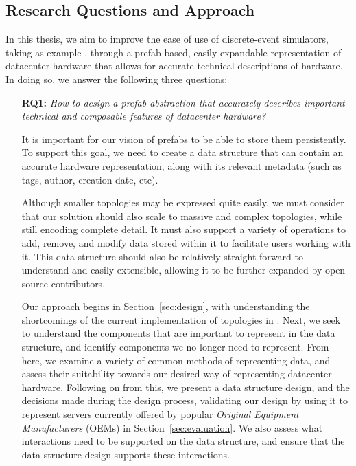 \documentclass[11pt]{article}
\begin{document}
	\subsection{Research Questions and Approach}
		In this thesis, we aim to improve the ease of use of discrete-event simulators, taking as example \opendc{}, through a prefab-based, easily expandable representation of datacenter hardware that allows for accurate technical descriptions of hardware. 
		In doing so, we answer the following three questions:
		\begin{itemize}
			\item [\textbf{RQ1:}] \textit{How to design a prefab abstraction that accurately describes important technical and composable features of datacenter hardware?}

			It is important for our vision of prefabs to be able to store them persistently.
			To support this goal, we need to create a data structure that can contain an accurate hardware representation, along with its relevant metadata (such as tags, author, creation date, etc).

			Although smaller topologies may be expressed quite easily, we must consider that our solution should also scale to massive and complex topologies, while still encoding complete detail.
			It must also support a variety of operations to add, remove, and modify data stored within it to facilitate users working with it.
			This data structure should also be relatively straight-forward to understand and easily extensible, allowing it to be further expanded by open source contributors.

			Our approach begins in Section~\ref{sec:design}, with understanding the shortcomings of the current implementation of topologies in \opendc{}.
			Next, we seek to understand the components that are important to represent in the data structure, and identify components we no longer need to represent.
			From here, we examine a variety of common methods of representing data, and assess their suitability towards our desired way of representing datacenter hardware.
			Following on from this, we present a data structure design, and the decisions made during the design process, validating our design by using it to represent servers currently offered by popular \textit{Original Equipment Manufacturers} (OEMs) in Section~\ref{sec:evaluation}.
			We also assess what interactions need to be supported on the data structure, and ensure that the data structure design supports these interactions.


\end{itemize}
\end{document}

